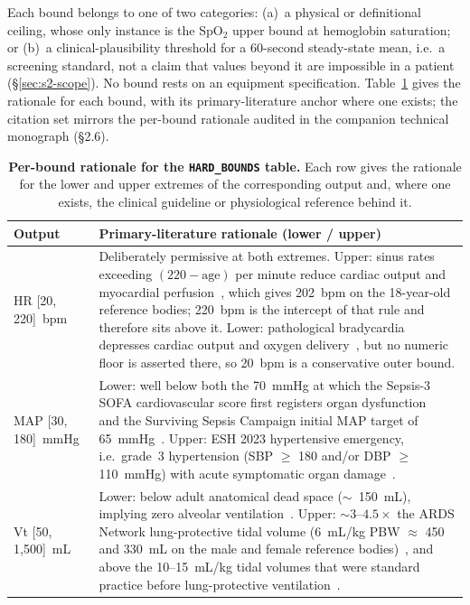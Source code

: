 \documentclass[pdflatex,sn-nature]{sn-jnl}%
\begin{document}
Each bound belongs to one of two categories: (a)~a physical or definitional ceiling, whose only instance is the SpO$_2$ upper bound at hemoglobin saturation; or (b)~a clinical-plausibility threshold for a 60-second steady-state mean, i.e.\ a screening standard, not a claim that values beyond it are impossible in a patient (\S\ref{sec:s2-scope}). No bound rests on an equipment specification. Table~\ref{tab:hard-bounds-rationale} gives the rationale for each bound, with its primary-literature anchor where one exists; the citation set mirrors the per-bound rationale audited in the companion technical monograph (§2.6).

\begin{table}[htbp]
\centering
\small
\caption{\textbf{Per-bound rationale for the \texttt{HARD\_BOUNDS} table.} Each row gives the rationale for the lower and upper extremes of the corresponding output and, where one exists, the clinical guideline or physiological reference behind it.}
\label{tab:hard-bounds-rationale}
\begin{tabular}{lp{}}
\toprule
Output & Primary-literature rationale (lower / upper) \\
\midrule
HR [20, 220]~bpm &
Deliberately permissive at both extremes. Upper: sinus rates exceeding $(220 - \mathrm{age})$ per minute reduce cardiac output and myocardial perfusion~\cite[Ch.~1]{marini2018critical}, which gives 202~bpm on the 18-year-old reference bodies; 220~bpm is the intercept of that rule and therefore sits above it. Lower: pathological bradycardia depresses cardiac output and oxygen delivery~\cite[Ch.~1]{marini2018critical}, but no numeric floor is asserted there, so 20~bpm is a conservative outer bound. \\
MAP [30, 180]~mmHg &
Lower: well below both the 70~mmHg at which the Sepsis-3 SOFA cardiovascular score first registers organ dysfunction~\cite{singer2016} and the Surviving Sepsis Campaign initial MAP target of 65~mmHg~\cite{evans2021sepsis}. Upper: ESH 2023 hypertensive emergency, i.e.\ grade~3 hypertension (SBP $\geq$ 180 and/or DBP $\geq$ 110~mmHg) with acute symptomatic organ damage~\cite{mancia2023esh}. \\
Vt [50, 1{,}500]~mL &
Lower: below adult anatomical dead space ($\sim$~150~mL), implying zero alveolar ventilation~\cite[Ch.~2]{west2020respiratory}. Upper: $\sim 3$--$4.5\times$ the ARDS Network lung-protective tidal volume (6~mL/kg PBW $\approx$ 450 and 330~mL on the male and female reference bodies)~\cite{brower2000}, and above the 10--15~mL/kg tidal volumes that were standard practice before lung-protective ventilation~\cite[Ch.~25]{marino2013icu}. \\

\end{tabular}
\end{table}
\end{document}
